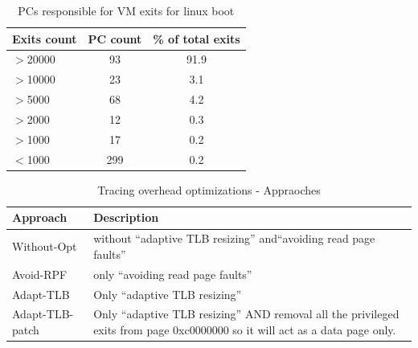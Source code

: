 \documentclass[10pt,twocolumn]{article}
\begin{document}
\begin{table}[!b]
\centering
\caption{PCs responsible for VM exits for linux boot}
     \begin{tabular}{lcc} \hline
       Exits count  & PC count & \% of total exits  \\ \hline
       $>$20000 & 93 & 91.9  \\
       $>$10000 & 23 & 3.1  \\
       $>$5000 & 68 & 4.2  \\
       $>$2000 & 12 & 0.3 \\
       $>$1000 & 17 & 0.2 \\
       $<$1000 & 299 & 0.2 \\
       \hline
     \end{tabular}
\label{tab:NumPCBase}
\end{table}


\begin{table}[!b]
\centering
\caption{Tracing overhead optimizations - Appraoches}
     \begin{tabular}{|l | p{5cm} |} \hline
       Approach \verb, , & Description \\ \hline
       Without-Opt & without “adaptive TLB resizing” and“avoiding read page faults” \\ \hline
       Avoid-RPF & only “avoiding read page faults” \\\hline
	   Adapt-TLB & Only “adaptive TLB resizing”  \\\hline
	   Adapt-TLB-patch & Only “adaptive TLB resizing” AND removal all the privileged exits from page 0xc0000000 so it will act as a data page only.\\\hline

     \end{tabular}
\label{tab:diff_approaches}
\end{table}
\end{document}
